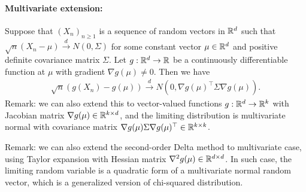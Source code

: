 \documentclass[11pt,letterpaper]{article}
\numberwithin{theorem}{lecture}
\numberwithin{proposition}{lecture}
\numberwithin{lemma}{lecture}
\numberwithin{claim}{lecture}
\numberwithin{corollary}{lecture}
\numberwithin{definition}{lecture}
\numberwithin{conjecture}{lecture}
\numberwithin{remark}{lecture}
\numberwithin{example}{lecture}
\numberwithin{equation}{lecture}
\begin{document}
\paragraph{Multivariate extension:} Suppose that $(X_n)_{n \geq 1}$ is a sequence of random vectors in $\mathbb{R}^d$ such that $\sqrt{n}(X_n - \mu) \xrightarrow{d} N(0, \Sigma)$ for some constant vector $\mu \in \mathbb{R}^d$ and positive definite covariance matrix $\Sigma$. Let $g: \mathbb{R}^d \to \mathbb{R}$ be a continuously differentiable function at $\mu$ with gradient $\nabla g(\mu) \neq 0$. Then we have
\begin{align*}
  \sqrt{n} (g(X_n) - g(\mu)) \xrightarrow{d} N(0, \nabla g(\mu)^\top \Sigma \nabla g(\mu)).
\end{align*}
Remark: we can also extend this to vector-valued functions $g: \mathbb{R}^d \to \mathbb{R}^k$ with Jacobian matrix $\nabla g(\mu) \in \mathbb{R}^{k \times d}$, and the limiting distribution is multivariate normal with covariance matrix $\nabla g(\mu) \Sigma \nabla g(\mu)^\top \in \mathbb{R}^{k \times k}$.

Remark: we can also extend the second-order Delta method to multivariate case, using Taylor expansion with Hessian matrix $\nabla^2 g(\mu) \in \mathbb{R}^{d \times d}$. In such case, the limiting random variable is a quadratic form of a multivariate normal random vector, which is a generalized version of chi-squared distribution.
\end{document}
